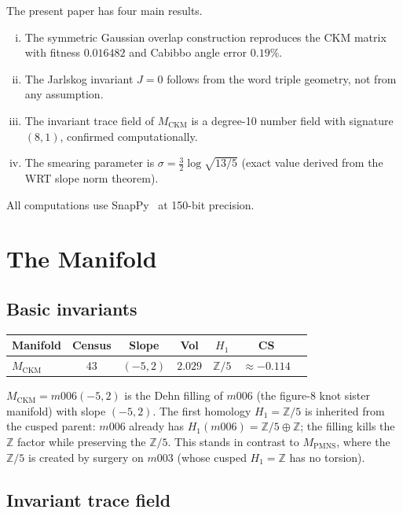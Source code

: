 \documentclass[11pt,a4paper]{article}
\theoremstyle{remark}
\newcommand{\MCKM}{M_{\mathrm{CKM}}}
\newcommand{\MPMNS}{M_{\mathrm{PMNS}}}
\newcommand{\Zfive}{\mathbb{Z}/5}
\newcommand{\ZZ}{\mathbb{Z}}
\begin{document}
The present paper has four main results.
\begin{enumerate}[(i)]
\item The symmetric Gaussian overlap construction reproduces the CKM
  matrix with fitness $0.016482$ and Cabibbo angle error $0.19\%$.
\item The Jarlskog invariant $J=0$ follows from the word triple
  geometry, not from any assumption.
\item The invariant trace field of $\MCKM$ is a degree-10 number
  field with signature $(8,1)$, confirmed computationally.
\item The smearing parameter is $\sigma=\frac{3}{2}\log\sqrt{13/5}$
  (exact value derived from the WRT slope norm theorem).
\end{enumerate}

All computations use SnapPy~\cite{SnapPy} at 150-bit precision.

\section{The Manifold}
\label{sec:manifold}

\subsection{Basic invariants}

\begin{center}
\begin{tabular}{lcccccc}
\toprule
Manifold & Census & Slope & Vol & $H_1$ & CS \\
\midrule
$\MCKM$ & 43 & $(-5,2)$ & $2.029$ & $\Zfive$ & $\approx-0.114$ \\
\bottomrule
\end{tabular}
\end{center}

$\MCKM = m006(-5,2)$ is the Dehn filling of $m006$ (the figure-8
knot sister manifold) with slope $(-5,2)$.
The first homology $H_1 = \Zfive$ is inherited from the cusped parent:
$m006$ already has $H_1(m006) = \Zfive \oplus \ZZ$; the filling
kills the $\ZZ$ factor while preserving the $\Zfive$.
This stands in contrast to $\MPMNS$, where the $\Zfive$ is created
by surgery on $m003$ (whose cusped $H_1 = \ZZ$ has no torsion).

\subsection{Invariant trace field}
\end{document}
